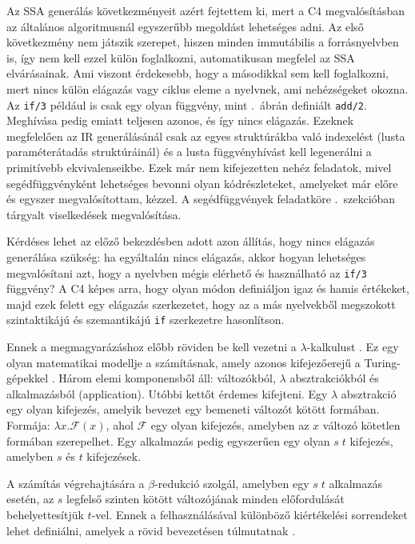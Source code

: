 Az \gls{SSA} generálás következményeit azért fejtettem ki, mert a C4 megvalósításban az általános algoritmusnál egyszerűbb megoldást lehetséges adni.
Az első következmény nem játszik szerepet, hiszen minden immutábilis a forrásnyelvben is, így nem kell ezzel külön foglalkozni, automatikusan megfelel az \gls{SSA} elvárásainak.
Ami viszont érdekesebb, hogy a másodikkal sem kell foglalkozni, mert nincs külön elágazás vagy ciklus eleme a nyelvnek, ami nehézségeket okozna.
Az {\tt if/3} például is csak egy olyan függvény, mint .~ábrán definiált {\tt add/2}.
Meghívása pedig emiatt teljesen azonos, és így nincs elágazás.
Ezeknek megfelelően az \gls{IR} generálásánál csak az egyes struktúrákba való indexelést (lusta paraméterátadás struktúráinál) és a lusta függvényhívást kell legenerálni a primitívebb ekvivalenseikbe.
Ezek már nem kifejezetten nehéz feladatok, mivel segédfüggvényként lehetséges bevonni olyan kódrészleteket, amelyeket már előre és egyszer megvalósítottam, kézzel.
A segédfüggvények feladatköre .~szekcióban tárgyalt viselkedések megvalósítása.

Kérdéses lehet az előző bekezdésben adott azon állítás, hogy nincs elágazás generálása szükség: ha egyáltalán nincs elágazás, akkor hogyan lehetséges megvalósítani azt, hogy a nyelvben mégis elérhető és használható az {\tt if/3} függvény?
A C4 képes arra, hogy olyan módon definiáljon igaz és hamis értékeket, majd ezek felett egy elágazás szerkezetet, hogy az a más nyelvekből megszokott szintaktikájú és szemantikájú {\tt if} szerkezetre hasonlítson.

Ennek a megmagyarázáshoz előbb röviden be kell vezetni a $\lambda$-kalkulust \cite{churchSetPostulatesFoundation1932}.
Ez egy olyan matematikai modellje a számításnak, amely azonos kifejezőerejű a Turing-gépekkel \cite{turingComputabilityLdefinability1937}.
Három elemi komponensből áll: változókból, $\lambda$ absztrakciókból és alkalmazásból (application).
Utóbbi kettőt érdemes kifejteni. 
Egy $\lambda$ absztrakció egy olyan kifejezés, amelyik bevezet egy bemeneti változót kötött formában. 
Formája: $\lambda x.\mathcal{F}(x)$, ahol $\mathcal{F}$ egy olyan kifejezés, amelyben az $x$ változó kötetlen formában szerepelhet.
Egy alkalmazás pedig egyszerűen egy olyan $s\;t$ kifejezés, amelyben $s$ és $t$ kifejezések.

A számítás végrehajtására a $\beta$-redukció szolgál, amelyben egy $s\;t$ alkalmazás esetén, az $s$ legfelső szinten kötött változójának minden előfordulását behelyettesítjük $t$-vel.
Ennek a felhasználásával különböző kiértékelési sorrendeket lehet definiálni, amelyek a rövid bevezetésen túlmutatnak \cite{Sestoft2002}.

